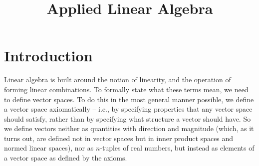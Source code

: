 \documentclass[svgnames]{article}
\theoremstyle{definition}
\theoremstyle{remark}
\newcommand{\newterm}[1]{{\color{alertcolor} #1}}
\begin{document}
\title{\textbf{Applied Linear Algebra}}

\date{}
\maketitle

\begingroup
\let\clearpage\relax
\tableofcontents
\endgroup

\clearpage

\renewcommand{\nomname}{List of Symbols}
\printnomenclature[10em]

\clearpage

\section{Introduction}\label{sec:Introduction}
Linear algebra is built around the notion of linearity, and the operation of forming linear combinations. To formally state what these terms mean, we need to define \newterm{vector spaces}. To do this in the most general manner possible, we define a vector space \newterm{axiomatically} -- i.e., by specifying properties that any vector space should satisfy, rather than by specifying what structure a vector should have. So we define vectors neither as quantities with direction and magnitude (which, as it turns out, are defined not in vector spaces but in inner product spaces and normed linear spaces), nor as $n$-tuples of real numbers, but instead as elements of a vector space as defined by the axioms.
\end{document}
